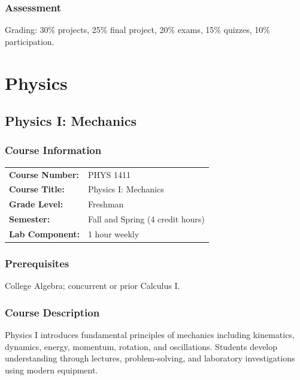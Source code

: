 \documentclass[12pt,oneside]{book}
\begin{document}
\section{Assessment}

Grading: 30\% projects, 25\% final project, 20\% exams, 15\% quizzes, 10\% participation.


\part{Physics}

\chapter{Physics I: Mechanics}

\section{Course Information}

\begin{tabular}{ll}
\textbf{Course Number:} & PHYS 1411 \\
\textbf{Course Title:} & Physics I: Mechanics \\
\textbf{Grade Level:} & Freshman \\
\textbf{Semester:} & Fall and Spring (4 credit hours) \\
\textbf{Lab Component:} & 1 hour weekly \\
\end{tabular}

\section{Prerequisites}

College Algebra; concurrent or prior Calculus I.

\section{Course Description}

Physics I introduces fundamental principles of mechanics including kinematics, dynamics, energy, momentum, rotation, and oscillations. Students develop understanding through lectures, problem-solving, and laboratory investigations using modern equipment.
\end{document}
